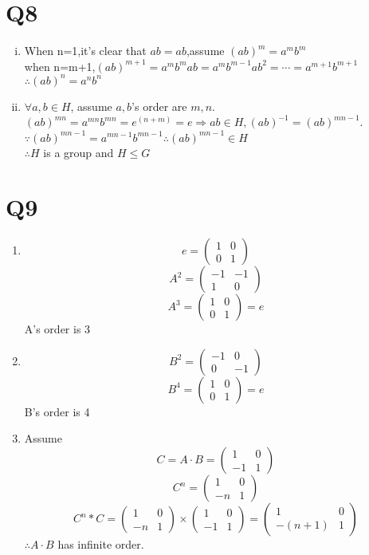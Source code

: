 \documentclass[12pt]{article}
\begin{document}
\section{Q8}
\begin{enumerate}[(i)]
\item When n=1,it's clear that $ab=ab$,assume $(ab)^m=a^mb^m$
\\when n=m+1,$(ab)^{m+1}=a^mb^mab=a^mb^{m-1}ab^2=\cdots =a^{m+1}b^{m+1}$
\\$\therefore (ab)^n=a^nb^n$
\item $\forall a,b\in H$, assume $a,b$'s order are $m,n.$
\\$(ab)^{mn}=a^{mn}b^{mn}=e^(n+m)=e\Rightarrow ab\in H,(ab)^{-1}=(ab)^{mn-1}$.
\\$\because (ab)^{mn-1}=a^{mn-1}b^{mn-1}\therefore (ab)^{mn-1}\in H$
\\$\therefore H$ is a group and $H\leq G$
\end{enumerate}
\section{Q9}
\begin{enumerate}
\item $$e=\begin{pmatrix}
1&0\\0&1
\end{pmatrix}$$
$$A^2=\begin{pmatrix}
-1&-1\\1&0
\end{pmatrix}$$
$$A^3=\begin{pmatrix}
1&0\\0&1
\end{pmatrix}=e$$
A's order is 3
\item 
$$B^2=\begin{pmatrix}
-1&0\\0&-1
\end{pmatrix}$$
$$B^4=\begin{pmatrix}
1&0\\0&1
\end{pmatrix}=e$$
B's order is 4
\item 
Assume 
$$C=A\cdot B=\begin{pmatrix}
1&0\\-1&1
\end{pmatrix}$$
$$C^n=\begin{pmatrix}
1&0\\-n&1
\end{pmatrix}$$
$$C^n*C=\begin{pmatrix}
1&0\\-n&1
\end{pmatrix}\times\begin{pmatrix}
1&0\\-1&1
\end{pmatrix}=\begin{pmatrix}
1&0\\-(n+1)&1
\end{pmatrix}$$
$\therefore A\cdot B$ has infinite order.
\end{enumerate}
\end{document}
